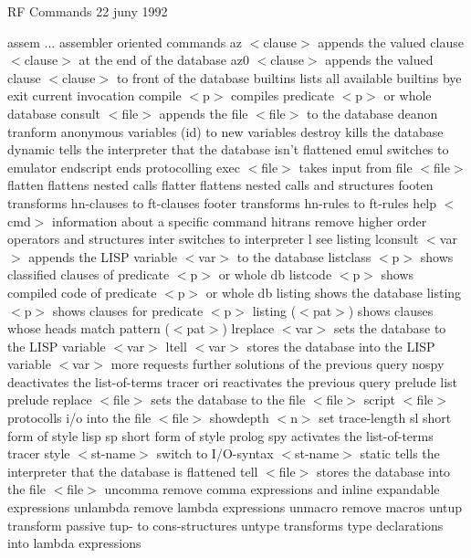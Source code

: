 RF Commands                                            22 juny 1992
~~~~~~~~~~~

assem ...	 assembler oriented commands
az $<$clause$>$      appends the valued clause $<$clause$>$ at the end of the database
az0 $<$clause$>$     appends the valued clause $<$clause$>$ to front of the database
builtins         lists all available builtins
bye              exit current \relfun invocation
compile $<$p$>$      compiles predicate $<$p$>$ or whole database
consult $<$file$>$   appends the file $<$file$>$ to the database
deanon		 tranform anonymous variables (id) to new variables
destroy          kills the database
dynamic          tells the interpreter that the database isn't flattened
emul             switches to emulator
endscript        ends protocolling
exec $<$file$>$      takes input from file $<$file$>$
flatten          flattens nested calls
flatter          flattens nested calls and structures
footen           transforms hn-clauses to ft-clauses
footer           transforms hn-rules to ft-rules
help $<$cmd$>$       information about a specific command
hitrans		 remove higher order operators and structures
inter            switches to interpreter
l                see listing
lconsult $<$var$>$   appends the LISP variable $<$var$>$ to the database
listclass $<$p$>$    shows classified clauses of predicate $<$p$>$ or whole db
listcode $<$p$>$     shows compiled code of predicate $<$p$>$ or whole db
listing          shows the database
listing $<$p$>$      shows clauses for predicate $<$p$>$
listing ($<$pat$>$)  shows clauses whose heads match pattern ($<$pat$>$)
lreplace $<$var$>$   sets the database to the LISP variable $<$var$>$
ltell $<$var$>$      stores the database into the LISP variable $<$var$>$
more             requests further solutions of the previous query
nospy            deactivates the list-of-terms tracer
ori              reactivates the previous query
prelude		 list prelude
replace $<$file$>$   sets the database to the file $<$file$>$
script $<$file$>$    protocolls i/o into the file $<$file$>$
showdepth $<$n$>$    set trace-length
sl		 short form of style lisp
sp		 short form of style prolog
spy              activates the list-of-terms tracer
style $<$st-name$>$  switch to I/O-syntax $<$st-name$>$
static           tells the interpreter that the database is flattened
tell $<$file$>$      stores the database into the file $<$file$>$
uncomma		 remove comma expressions and inline expandable expressions
unlambda	 remove lambda expressions
unmacro		 remove macros
untup            transform passive tup- to cons-structures
untype		 transforms type declarations into lambda expressions
